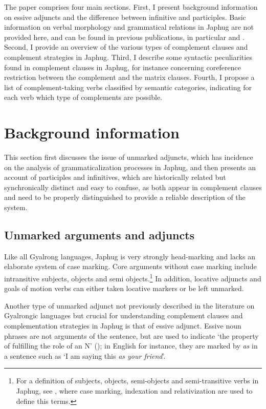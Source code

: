 \documentclass[oneside,a4paper,11pt]{article}
\begin{document}
The paper comprises four main sections. First, I present background information on essive adjuncts and the difference between infinitive and participles. Basic information on verbal morphology and grammatical relations in Japhug are not provided here, and can be found in previous publications, in particular \citet{jacques14linking} and \citet{jacques16relatives}. Second, I provide an overview of the various types of complement clauses and complement strategies in Japhug. Third, I describe some  syntactic peculiarities found in complement clauses in Japhug, for instance concerning coreference restriction between the complement and the matrix clauses. Fourth, I propose a list of complement-taking verbs classified by semantic categories, indicating for each verb which type of complements are possible.

\section{Background information}
This section first discusses the issue of unmarked adjuncts, which has incidence on the analysis of grammaticalization processes in Japhug, and then presents an account of participles and infinitives, which are historically related but synchronically distinct and easy to confuse, as both appear in complement clauses and need to be properly distinguished to provide a reliable description of the system.

 \subsection{Unmarked arguments and adjuncts} \label{sec:adjuncts}
Like all Gyalrong languages, Japhug is very strongly head-marking and lacks an elaborate system of case marking. Core arguments without case marking include intransitive subjects, objects and semi objects.\footnote{For a definition of subjects, objects, semi-objects and semi-transitive verbs in Japhug, see \citet{jacques16relatives}, where case marking, indexation and relativization are used to define this terms.} In addition, locative adjuncts and goals of motion verbs can either taken locative markers or be left unmarked.

Another type of unmarked adjunct not previously described in the literature on Gyalrongic languages but crucial for understanding complement clauses and complementation strategies in Japhug is that of essive adjunct. Essive noun phrases are not arguments of the sentence, but are used to indicate `the property of fulfilling the role of an N' (\citealt[606]{creissels14functive}); in English for instance, they are marked by \textit{as} in a sentence such as `I am saying this \textit{as your friend}'.
\end{document}
